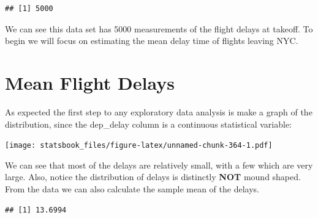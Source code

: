 \documentclass[
]{book}
\newenvironment{Shaded}{\begin{snugshade}}{\end{snugshade}}
\newcommand{\AttributeTok}[1]{\textcolor[rgb]{0.77,0.63,0.00}{#1}}
\newcommand{\FunctionTok}[1]{\textcolor[rgb]{0.00,0.00,0.00}{#1}}
\newcommand{\NormalTok}[1]{#1}
\newcommand{\OtherTok}[1]{\textcolor[rgb]{0.56,0.35,0.01}{#1}}
\newcommand{\SpecialCharTok}[1]{\textcolor[rgb]{0.00,0.00,0.00}{#1}}
\newcommand{\StringTok}[1]{\textcolor[rgb]{0.31,0.60,0.02}{#1}}
\theoremstyle{definition}
\theoremstyle{definition}
\theoremstyle{definition}
\theoremstyle{definition}
\theoremstyle{remark}
\begin{document}
\begin{Shaded}
\end{Shaded}

\begin{verbatim}
## [1] 5000
\end{verbatim}

We can see this data set has 5000 measurements of the flight delays at takeoff. To begin we will focus on estimating the mean delay time of flights leaving NYC.

\hypertarget{mean-flight-delays}{%
\section{Mean Flight Delays}\label{mean-flight-delays}}

As expected the first step to any exploratory data analysis is make a graph of the distribution, since the dep\_delay column is a continuous statistical variable:

\begin{Shaded}
\end{Shaded}

\texttt{[image: statsbook\_files/figure-latex/unnamed-chunk-364-1.pdf]}

We can see that most of the delays are relatively small, with a few which are very large. Also, notice the distribution of delays is distinctly \textbf{NOT} mound shaped. From the data we can also calculate the sample mean of the delays.

\begin{Shaded}
\end{Shaded}

\begin{verbatim}
## [1] 13.6994
\end{verbatim}
\end{document}
